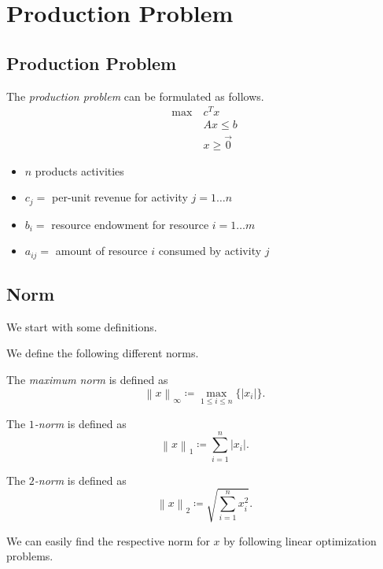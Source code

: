\chapter{Production Problem}
\section{Production Problem}
The \emph{production problem} can be formulated as follows.
\begin{align*}
	\max~ & c^Tx          \\
	      & Ax \leq b     \\
	      & x\geq \vec{0}
\end{align*}
\begin{itemize}
	\item \(n\) products activities
	\item \(c_{j}=\) per-unit revenue for activity \(j = 1\ldots n\)
	\item \(b_{i}=\) resource endowment for resource \(i = 1\ldots m\)
	\item \(a_{ij}=\) amount of resource \(i\) consumed by activity \(j\)
\end{itemize}

\section{Norm}
We start with some definitions.
\begin{definition}
	We define the following different norms.
	\begin{definition}\label{def:maximum-norm}
		The \emph{maximum norm} is defined as
		\[
			\left\lVert x\right\rVert_{\infty } \coloneqq \max_{1\leq i \leq n}\{\left\vert x_i \right\vert \}.
		\]
	\end{definition}
	\begin{definition}[\(1\)-norm]\label{def:1-norm}
		The \emph{\(1\)-norm} is defined as
		\[
			\left\lVert x\right\rVert_{1} \coloneqq \sum\limits_{i=1}^{n} \left\vert x_i \right\vert.
		\]
	\end{definition}
	\begin{definition}[\(2\)-norm]\label{def:2-norm}
		The \emph{\(2\)-norm} is defined as
		\[
			\left\lVert x\right\rVert_{2} \coloneqq \sqrt{\sum\limits_{i=1}^{n} x_i^2}.
		\]
	\end{definition}
\end{definition}

We can easily find the respective norm for \(x\) by following linear optimization problems.

